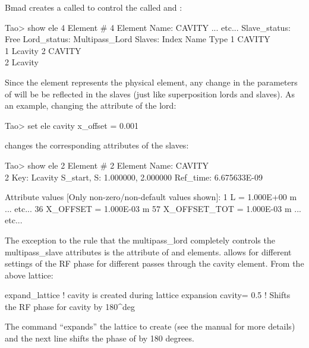 \documentclass{hitec}
\begin{document}
Bmad creates a  called  to control the  called
 and :
\begin{code}
Tao> show ele 4
 Element #                4
 Element Name: CAVITY
... etc...
Slave_status: Free
Lord_status:  Multipass_Lord
Slaves:
   Index   Name        Type
       1   CAVITY\\1    Lcavity
       2   CAVITY\\2    Lcavity
\end{code}

Since the  element represents the physical element, any change in the parameters of 
will be be reflected in the slaves (just like superposition lords and slaves). As an example, changing
the attribute of the lord:
\begin{code}
Tao> set ele cavity x_offset = 0.001
\end{code}
changes the corresponding attributes of the slaves:
\begin{code}
Tao> show ele 2
 Element #                2
 Element Name: CAVITY\\2
 Key: Lcavity
 S_start, S:    1.000000,    2.000000
 Ref_time:  6.675633E-09

 Attribute values [Only non-zero/non-default values shown]:
    1   L          =  1.000E+00 m
... etc...
   36   X_OFFSET   =  1.000E-03 m        57   X_OFFSET_TOT  =  1.000E-03 m
... etc...
\end{code}

The exception to the rule that the multipass_lord completely controls the multipass_slave attributes
is the  attribute of  and  elements. 
allows for different settings of the RF phase for different passes through the cavity element.
From the above lattice:
\begin{code}
expand_lattice                 ! cavity\2 is created during lattice expansion
cavity = 0.5 ! Shifts the RF phase for cavity\2 by 180^deg
\end{code}
The  command ``expands'' the lattice to create  (see the \bmad
manual for more details) and the next line shifts the phase of  by 180 degrees.
\end{document}
